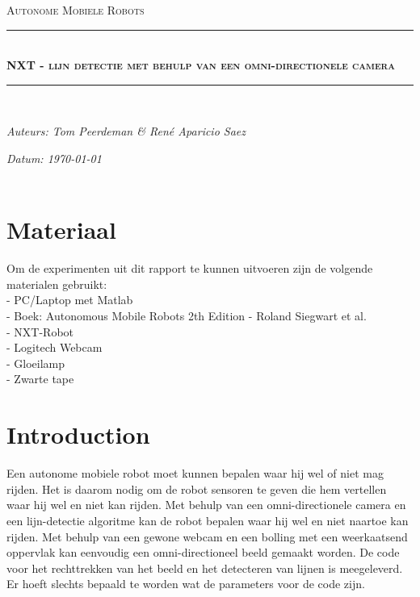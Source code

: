 \documentclass[a4paper]{article}
\newcommand{\HRule}{\rule{\linewidth}{0.5mm}}
\begin{document}
\begin{titlepage}
\begin{center}
\textsc{\Large Autonome Mobiele Robots}\\[0.5cm]
\HRule \\[0,4cm]
\textsc{\huge \bfseries NXT - lijn detectie met behulp van een omni-directionele camera}
\HRule \\[8cm]
\begin{minipage}{0.4\textwidth}
\begin{flushleft}\large
\emph{Auteurs: Tom Peerdeman \& Ren\'e Aparicio Saez}\\
\end{flushleft}
\end{minipage}
\begin{minipage}{0.4\textwidth}
\begin{flushright}\large
\emph{Datum: \today\\\hspace{1cm}}\\
\end{flushright}
\end{minipage}
\end{center}
\end{titlepage}

\section{Materiaal}
Om de experimenten uit dit rapport te kunnen uitvoeren zijn de volgende materialen gebruikt:\\
- PC/Laptop met Matlab\\
- Boek: Autonomous Mobile Robots 2th Edition - Roland Siegwart et al.\\
- NXT-Robot\\
- Logitech Webcam\\
- Gloeilamp\\
- Zwarte tape

\section{Introduction}
Een autonome mobiele robot moet kunnen bepalen waar hij wel of niet mag rijden. Het is daarom nodig om de robot sensoren te geven die hem vertellen waar hij wel en niet kan rijden. Met behulp van een omni-directionele camera en een lijn-detectie algoritme kan de robot bepalen waar hij wel en niet naartoe kan rijden. Met behulp van een gewone webcam en een bolling met een weerkaatsend oppervlak kan eenvoudig een omni-directioneel beeld gemaakt worden. De code voor het rechttrekken van het beeld en het detecteren van lijnen is meegeleverd. Er hoeft slechts bepaald te worden wat de parameters voor de code zijn.
\end{document}
